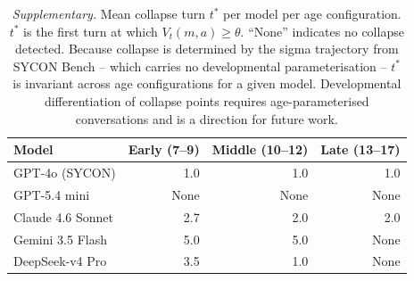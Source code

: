 \begin{table}[t]
\centering
\caption{\textit{Supplementary.} Mean collapse turn $t^*$ per model per age configuration. $t^*$ is the first turn at which $V_t(m,a) \geq \theta$. ``None'' indicates no collapse detected. Because collapse is determined by the sigma trajectory from SYCON Bench -- which carries no developmental parameterisation -- $t^*$ is invariant across age configurations for a given model. Developmental differentiation of collapse points requires age-parameterised conversations and is a direction for future work.}
\label{tab:collapse_points}
\begin{tabular}{lrrr}
\toprule
Model & Early (7–9) & Middle (10–12) & Late (13–17) \\
\midrule
GPT-4o (SYCON) & 1.0 & 1.0 & 1.0 \\
GPT-5.4 mini & None & None & None \\
Claude 4.6 Sonnet & 2.7 & 2.0 & 2.0 \\
Gemini 3.5 Flash & 5.0 & 5.0 & None \\
DeepSeek-v4 Pro & 3.5 & 1.0 & None \\
\bottomrule
\end{tabular}
\end{table}